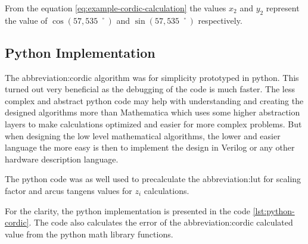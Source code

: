 \documentclass[a4paper, twoside, 11pt]{article}
\begin{document}
            \par
            From the equation \ref{eq:example-cordic-calculation} the values $x_2$ and $y_2$ represent the value of $\cos (57,535\;˚)$ and $\sin (57,535\;˚)$ respectively.

    \subsection{Python Implementation}\label{subsec:cordic-python-implementation}
        The \gls{abbreviation:cordic} algorithm was for simplicity prototyped in python. This turned out very beneficial as the debugging of the code is much faster. The less complex and abstract python code may help with understanding and creating the designed algorithms more than Mathematica which uses some higher abstraction layers to make calculations optimized and easier for more complex problems. But when designing the low level mathematical algorithms, the lower and easier language the more easy is then to implement the design in Verilog or any other hardware description language.\par
        The python code was as well used to precalculate the \gls{abbreviation:lut} for scaling factor and arcus tangens values for $z_i$ calculations.\par
        For the clarity, the python implementation is presented in the code \ref{lst:python-cordic}. The code also calculates the error of the \gls{abbreviation:cordic} calculated value from the python math library functions.
\end{document}
